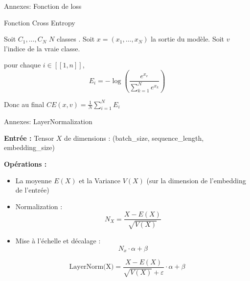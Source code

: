 \documentclass[12pt]{beamer}
\begin{document}
\begin{frame}{Annexes: Fonction de loss}

Fonction Cross Entropy

Soit $C_1, \dots, C_N$  $N$ classes . Soit $x = (x_1, \dots, x_N)$ la sortie du modèle.
Soit $v$ l'indice de la vraie classe.

pour chaque $i \in [\![1, n]\!]$, $$E_i = - \log \left ( \frac{e^{x_v}}{\sum_{k=1}^N e^{x_k}} \right )$$

Donc au final $CE(x, v) = \frac{1}{N} \sum_{i=1}^N E_i$ 


\end{frame}





\begin{frame}{Annexes: LayerNormalization}

\footnotesize
\textbf{Entrée : } Tensor $X$ de dimensions : (batch\_size, sequence\_length, embedding\_size)

\textbf{Opérations : }

\begin{itemize}
	\item La moyenne $E(X)$ et la Variance $V(X)$ (sur la dimension de l'embedding de l'entrée)
	\item Normalization : $$N_X = \frac{X - E(X)}{\sqrt{V(X)}}$$
	\item Mise à l'échelle et décalage : $$N_x \cdot \alpha + \beta$$
\end{itemize}

$$\text{LayerNorm(X)} = \frac{X - E(X)}{\sqrt{V(X)}+\varepsilon} \cdot \alpha + \beta$$

\normalsize

\end{frame}




\end{document}
